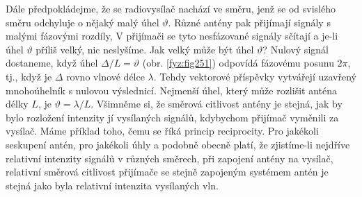     Dále předpokládejme, že se radiovysílač nachází ve směru, jenž se od svislého směru odchyluje o 
    nějaký malý úhel \(\vartheta\). Různé antény pak přijímají signály s malými fázovými rozdíly, V 
    přijímači se tyto nesfázované signály sčítají a je-li úhel \(\vartheta\) příliš velký, nic 
    neslyšíme. Jak velký může být úhel \(\vartheta\)? Nulový signál dostaneme, když úhel \(\Delta/L 
    =\vartheta\) (obr. \ref{fyz:fig251}) odpovídá fázovému posunu \(2\pi\), tj., když je \(\Delta\) 
    rovno vlnové délce \(\lambda\). Tehdy vektorové příspěvky vytvářejí uzavřený mnohoúhelník s 
    nulovou výslednicí. Nejmenší úhel, který může rozlišit anténa délky \(L\), je \(\vartheta = 
    \lambda/L\). Všimněme si, že směrová citlivost antény je stejná, jak by bylo rozložení 
    intenzity jí vysílaných signálů, kdybychom přijímač vyměnili za vysílač. Máme příklad toho, 
    čemu se říká princip reciprocity. Pro jakékoli seskupení antén, pro jakékoli úhly a podobně 
    obecně platí, že zjistíme-li nejdříve relativní intenzity signálů v různých směrech, při 
    zapojení antény na vysílač, relativní směrová citlivost přijímače se stejně zapojeným systémem 
    antén je stejná jako byla relativní intenzita vysílaných vln. 
    
